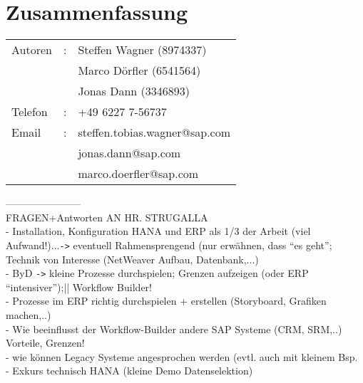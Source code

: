 \newpage
\thispagestyle{empty}
\section*{Zusammenfassung}
\label{chap:Zusammenfassung}

\begin{tabular}{lll}
Autoren	&:& Steffen Wagner (8974337) \\
&& Marco Dörfler (6541564) \\
&& Jonas Dann (3346893) \\
Telefon	&:& +49 6227 7-56737 \\
Email	&:& steffen.tobias.wagner@sap.com \\
&& jonas.dann@sap.com\\
&& marco.doerfler@sap.com\\
\end{tabular}

\vspace*{3em}

-----------------------\\
\large{FRAGEN+Antworten AN HR. STRUGALLA}\\
- Installation, Konfiguration HANA und ERP als 1/3 der Arbeit (viel Aufwand!)...\verb|->| eventuell Rahmensprengend (nur erwähnen, dass "`es geht"'; Technik von Interesse (NetWeaver Aufbau, Datenbank,...)\\
- ByD \verb|->| kleine Prozesse durchspielen; Grenzen aufzeigen (oder ERP "`intensiver"');|| Workflow Builder!\\
- Prozesse im ERP richtig durchspielen + erstellen (Storyboard, Grafiken machen,..)\\ 
- Wie beeinflusst der Workflow-Builder andere SAP Systeme (CRM, SRM,..) Vorteile, Grenzen!\\
- wie können Legacy Systeme angesprochen werden (evtl. auch mit kleinem Bsp.\\
- Exkurs technisch HANA (kleine Demo Datenselektion)\\

